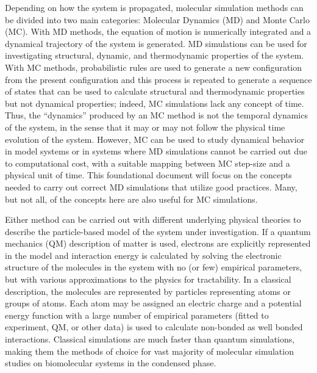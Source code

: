 \documentclass[9pt,bestpractices]{livecoms}
\begin{document}
Depending on how the system is propagated, molecular simulation methods can be divided into two main categories: Molecular Dynamics (MD) and Monte Carlo (MC).
With MD methods, the equation of motion is numerically integrated and a dynamical trajectory of the system is generated. 
MD simulations can be used for investigating structural, dynamic, and thermodynamic properties of the system.
With MC methods, probabilistic rules are used to generate a new configuration from the present configuration and this process is repeated to generate a sequence of states that can be used to calculate structural and thermodynamic properties but not dynamical properties; indeed, MC simulations lack any concept of time. 
Thus, the ``dynamics'' produced by an MC method is not the temporal dynamics of the system, in the sense that it may or may not follow the physical time evolution of the system. 
However, MC can be used to study dynamical behavior in model systems or in systems where MD simulations cannot be carried out due to computational cost, with a suitable mapping between MC step-size and a physical unit of time. 
This foundational document will focus on the concepts needed to carry out correct MD simulations that utilize good practices. 
Many, but not all, of the concepts here are also useful for MC simulations.

Either method can be carried out with different underlying physical theories to describe the particle-based model of the system under investigation.
If a quantum mechanics (QM) description of matter is used, electrons are explicitly represented in the model and interaction energy is calculated by solving the electronic structure of the molecules in the system with no (or few) empirical parameters, but with various approximations to the physics for tractability.  In a classical description, the molecules are represented by particles representing atoms or groups of atoms.  Each atom may be assigned an electric charge and a potential energy function with a large number of empirical parameters (fitted to experiment, QM, or other data)  is used to calculate non-bonded as well bonded interactions.
Classical simulations are much faster than quantum simulations, making them the methods of choice for vast majority of molecular simulation
studies on biomolecular systems in the condensed phase.
\end{document}
